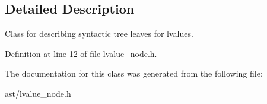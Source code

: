 \subsection{Detailed Description}
Class for describing syntactic tree leaves for lvalues. 

Definition at line 12 of file lvalue\+\_\+node.\+h.



The documentation for this class was generated from the following file\+:\begin{DoxyCompactItemize}
\item 
ast/lvalue\+\_\+node.\+h\end{DoxyCompactItemize}
